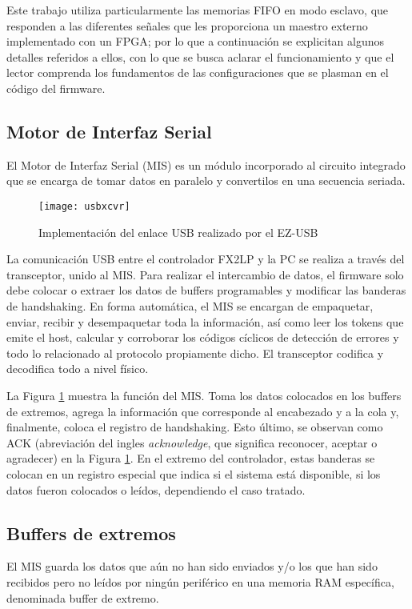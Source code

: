 Este trabajo utiliza particularmente las memorias FIFO en modo esclavo, que responden a las diferentes señales que les proporciona un maestro externo implementado con un FPGA; por lo que a continuación se explicitan algunos detalles referidos a ellos, con lo que se busca aclarar el funcionamiento y que el lector comprenda los fundamentos de las configuraciones que se plasman en el código del firmware.

\subsection{Motor de Interfaz Serial}
	El Motor de Interfaz Serial (MIS) es un módulo incorporado al circuito integrado que se encarga de tomar datos en paralelo y convertilos en una secuencia seriada.

	\begin{figure}[ht]%
		\centering
		\texttt{[image: usbxcvr]}
		\caption{Implementación del enlace USB realizado por el EZ-USB\cite{CypressSemiconductor2014fx2lp}}%
		\label{usbxcvr}
	\end{figure}
	
	La comunicación USB entre el controlador FX2LP y la PC se realiza a través del transceptor, unido al MIS. Para realizar el intercambio de datos, el firmware solo debe colocar o extraer los datos de buffers programables y modificar las banderas de handshaking. En forma automática, el MIS se encargan de empaquetar, enviar, recibir y desempaquetar toda la información, así como leer los tokens que emite el host, calcular y corroborar los códigos cíclicos de detección de errores y todo lo relacionado al protocolo propiamente dicho. El transceptor codifica y decodifica todo a nivel físico.%
	
	La Figura \ref{usbxcvr} muestra la función del MIS. Toma los datos colocados en los buffers de extremos, agrega la información que corresponde al encabezado y a la cola y, finalmente, coloca el registro de handshaking. Esto último, se observan como ACK (abreviación del ingles {\it acknowledge}, que significa reconocer, aceptar o agradecer) en la Figura \ref{usbxcvr}. En el extremo del controlador, estas banderas se colocan en un registro especial que indica si el sistema está disponible, si los datos fueron colocados o leídos, dependiendo el caso tratado.
		
\subsection{Buffers de extremos}
	El MIS guarda los datos que aún no han sido enviados y/o los que han sido recibidos pero no leídos por ningún periférico en una memoria RAM específica, denominada buffer de extremo.%
	
